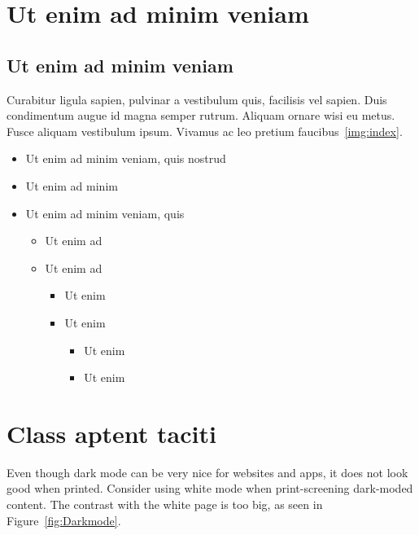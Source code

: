 \section{Ut enim ad minim veniam}

\lipsum[2-4]

\subsection{Ut enim ad minim veniam}

Curabitur ligula sapien, pulvinar a vestibulum quis, facilisis vel sapien. Duis condimentum augue id magna semper rutrum. Aliquam ornare wisi eu metus. Fusce aliquam vestibulum ipsum. Vivamus ac leo pretium faucibus~\ref{img:index}.

\begin{itemize}
    \item Ut enim ad minim veniam, quis nostrud
    \item Ut enim ad minim 
    \item Ut enim ad minim veniam, quis 
    \begin{itemize}
        \item Ut enim ad
        \item Ut enim ad
        \begin{itemize}
            \item Ut enim 
            \item Ut enim 
            \begin{itemize}
            \item Ut enim 
            \item Ut enim 
        \end{itemize}
        \end{itemize}
    \end{itemize}
\end{itemize}

\section{Class aptent taciti}


Even though dark mode can be very nice for websites and apps, it does not look good when printed. Consider using white mode when print-screening dark-moded content. The contrast with the white page is too big, as seen in Figure~\ref{fig:Darkmode}.

